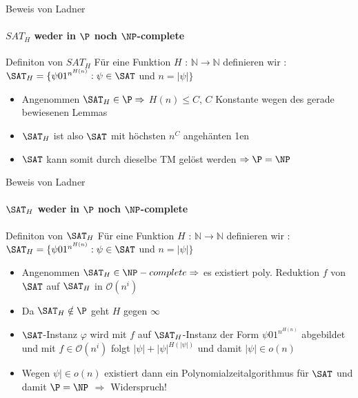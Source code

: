 \begin{frame}{Beweis von Ladner}
	\framesubtitle{${SAT}_H$ weder in $\P$ noch  $\NP$-complete}
	\begin{KITinfoblock}{Definiton von ${SAT}_H$}
		Für eine Funktion $H$ : $\mathbb{N} \rightarrow \mathbb{N}$ definieren wir : \newline 	
		${\SAT}_H = \lbrace \psi 01^{n^{H(n)}} : \psi \in \SAT$ und $ n = |\psi| \rbrace$
	\end{KITinfoblock}
	\bigskip
	\pause
	\bigskip
	\begin{itemize}[<+->]
		\item Angenommen ${\SAT}_H \in \P \Rightarrow $  $H(n) \le C$, $C$ Konstante wegen des gerade bewiesenen Lemmas
		\item ${\SAT}_H$ ist also $\SAT$  mit höchsten $n^C$  angehänten 1en
		\item $\SAT$ kann somit durch dieselbe TM gelöst werden $\Rightarrow \P = \NP$
	\end{itemize}
	
\end{frame}

\begin{frame}{Beweis von Ladner}
		\framesubtitle{${\SAT}_H$ weder in $\P$ noch $\NP$-complete}
	
		\begin{KITinfoblock}{Definiton von ${\SAT}_H$}
			Für eine Funktion $H$ : $\mathbb{N} \rightarrow \mathbb{N}$ definieren wir : \newline 	
			${\SAT}_H = \lbrace \psi 01^{n^{H(n)}} : \psi \in \SAT$ und $ n = |\psi| \rbrace$
		\end{KITinfoblock}
		
		
		\bigskip
		
		\bigskip
		\pause
		\begin{itemize}[<+->]
		\item Angenommen ${\SAT}_H \in \NP-complete \Rightarrow $ es existiert poly. Reduktion $f$ von $\SAT$ auf ${\SAT}_H$ in $\mathcal{O}(n^i)$
		\item Da ${\SAT}_H \notin \P $ geht $H$ gegen $\infty$ 
		\item $\SAT$-Instanz $\varphi$ wird mit $f$ auf ${\SAT}_H$-Instanz der Form $\psi01^{n^{H(n)}}$ abgebildet und mit $ f \in \mathcal{O}(n^i)$ folgt \newline
		$|\psi| + {|\psi|}^{H(|\psi|)}$ und damit $|\psi| \in o(n)$
		\item Wegen $\psi| \in o(n)$ existiert dann ein Polynomialzeitalgorithmus für $\SAT$ und damit $\P = \NP$  $\Rightarrow$ Widerspruch! 
		
		\end{itemize}
\end{frame}